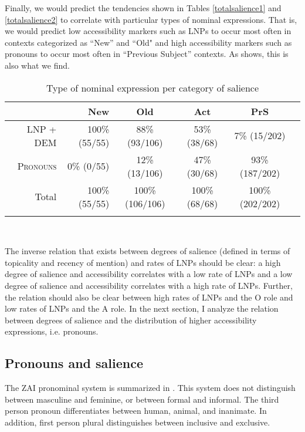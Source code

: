 Finally, we would predict the tendencies shown in Tables \ref{totalsalience1} and \ref{totalsalience2} to correlate with particular types of nominal expressions. That is, we would predict low accessibility markers such as LNPs to occur most often in contexts categorized as ``New'' and ``Old" and high accessibility markers such as pronouns to occur most often in ``Previous Subject'' contexts. As  shows, this is also what we find.
\begin{table}

\caption{{Type of nominal expression per category of salience}}
\begin{tabular}{ r  r  c  c  c  c }
\lsptoprule
 & New & Old & Act & PrS \\

\midrule
\textsc{LNP + DEM} &  100{\%} (55/55) &  88{\%} (93/106) & 53{\%} (38/68) & 7{\%} (15/202) \\

 
\textsc{Pronouns} & 0{\%} (0/55) & 12{\%} (13/106) & 47{\%} (30/68) & 93{\%} (187/202) \\

\midrule 
Total& 100{\%} (55/55) & 100{\%} (106/106) & 100{\%} (68/68) &100{\%} (202/202) \\

\lspbottomrule
\end{tabular}\\
\label{saliencetype}

\end{table}

The inverse relation that exists between degrees of salience (defined in terms of topicality and recency of mention) and rates of LNPs should be clear: a high degree of salience and accessibility correlates with a low rate of LNPs and a low degree of salience and accessibility correlates with a high rate of LNPs. Further, the relation should also be clear between high rates of LNPs and the O role and low rates of LNPs and the A role. In the next section, I analyze the relation between degrees of salience and the distribution of higher accessibility expressions, i.e. pronouns. 



\subsection{Pronouns and salience}\label{izpronouns}

The ZAI pronominal system is summarized in . This system does not distinguish between masculine and feminine, or between formal and informal. The third person pronoun differentiates between human, animal, and inanimate. In addition, first person plural distinguishes between inclusive and exclusive.

